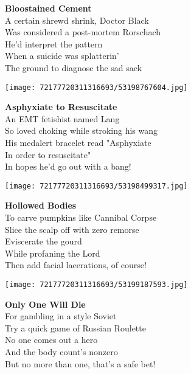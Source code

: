 \documentclass[10pt,letterpaper]{article}
\begin{document}
\begin{center}
\textbf{Bloostained Cement}\\
\vskip 0.2in
A certain shrewd shrink, Doctor Black\\
Was considered a post-mortem Rorschach\\
He'd interpret the pattern\\
When a suicide was splatterin'\\
The ground to diagnose the sad sack\\
\end{center}
\pagebreak

\begin{center}
\texttt{[image: 72177720311316693/53198767604.jpg]}
\end{center}

\begin{center}
\textbf{Asphyxiate to Resuscitate}\\
\vskip 0.2in
An EMT fetishist named Lang\\
So loved choking while stroking his wang\\
His medalert bracelet read "Asphyxiate\\
In order to resuscitate"\\
In hopes he'd go out with a bang!\\
\end{center}
\pagebreak

\begin{center}\texttt{[image: 72177720311316693/53198499317.jpg]}
\end{center}
\begin{center}
\textbf{Hollowed Bodies}\\
\vskip 0.2in
To carve pumpkins like Cannibal Corpse\\
Slice the scalp off with zero remorse\\
Eviscerate the gourd\\
While profaning the Lord\\
Then add facial lacerations, of course!\\
\end{center}
\pagebreak

\begin{center}\texttt{[image: 72177720311316693/53199187593.jpg]}
\end{center}
\begin{center}
\textbf{Only One Will Die}\\
\vskip 0.2in
For gambling in a style Soviet\\
Try a quick game of Russian Roulette\\
No one comes out a hero\\
And the body count's nonzero\\
But no more than one, that's a safe bet!\\
\end{center}
\pagebreak
\end{document}
